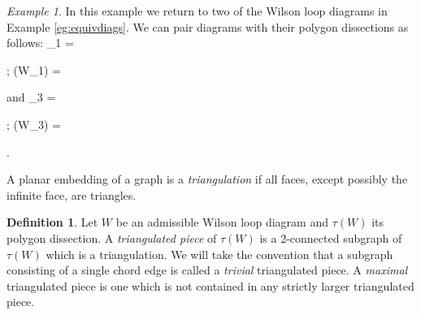 \documentclass[11pt]{article}
\newcommand{\drawWLD}[2]{

\pgfmathsetmacro{\n}{#1}
\pgfmathsetmacro{\radius}{#2}
\pgfmathsetmacro{\angle}{360/\n}
\draw (0,0) circle (\radius);
    \foreach \i in {1,2,...,\n} {
      \draw (\angle*\i:\radius) node {$\bullet$};
    }

}
\newcommand{\drawpolypart}[2]{
\pgfmathsetmacro{\n}{#1}
\pgfmathsetmacro{\radius}{#2}
\pgfmathsetmacro{\angle}{360/\n}
    \foreach \i in {1,2,...,\n} {
      \draw (\angle*\i+ \angle/2:\radius) node {$\bullet$};
     \pgfmathsetmacro{\x}{\angle*\i - \angle/2}
      \pgfmathsetmacro{\concave}{((\n-1.5)/\n)}
      \draw (\x:\radius cm) .. controls (\angle *\i: \concave* \radius cm) .. (\x + \angle:\radius cm);
    }

}
\newcommand{\drawprop}[4]{
\pgfmathsetmacro{\r}{#1}
\pgfmathsetmacro{\bumpr}{#2}
\pgfmathsetmacro{\s}{#3}
\pgfmathsetmacro{\bumps}{#4}
\pgfmathsetmacro{\perturbe}{\angle/\n}

\begin{scope}
\draw[propagator] (\angle*\r + \angle/2 + \bumpr*\perturbe:\radius) -- (\angle*\s + \angle/2 + \bumps*\perturbe:\radius);
\end{scope}
}
\newcommand{\drawchord}[2]{
\pgfmathsetmacro{\r}{#1}
\pgfmathsetmacro{\s}{#2}

\begin{scope}
\draw (\angle*\r + \angle/2:\radius) -- (\angle*\s + \angle/2:\radius);
\end{scope}
}
\newcommand{\drawnumbers}{
  \foreach \i in {1,2,...,\n} {
  \pgfmathsetmacro{\x}{\angle*\i}
  \draw (\x:\radius*1.15) node {\footnotesize \i};
}
}
\newcommand{\drawnumbersshift}{
  \foreach \i in {1,2,...,\n} {
  \pgfmathsetmacro{\x}{\angle*\i + \angle/2}
  \draw (\x:\radius*1.15) node {\footnotesize \i};
}
}
\def\bas #1\eas{\begin{align*} #1 \end{align*}}
\theoremstyle{remark}
\newtheorem{eg}[thm]{Example}
\theoremstyle{definition}
\newtheorem{dfn}[thm]{Definition}
\begin{document}
\begin{eg}\label{WLDtopolygonpartition}
In this example we return to two of the Wilson loop diagrams in Example \ref{eg:equivdiags}. We can pair diagrams with their polygon dissections as follows:
\bas W_1 =  \quad; \quad
\tau(W_1) = 
\eas and
\bas W_3 = \quad; \quad
\tau(W_3) =  .
\eas

\end{eg}

A planar embedding of a graph is a \emph{triangulation} if all faces, except possibly the infinite face, are triangles.

\begin{dfn}
  Let $W$ be an admissible Wilson loop diagram and $\tau(W)$ its polygon dissection. A \emph{triangulated piece} of $\tau(W)$ is a 2-connected subgraph of $\tau(W)$ which is a triangulation. We will take the convention that a subgraph consisting of a single chord edge is called a \emph{trivial} triangulated piece.
A {\em maximal} triangulated piece is one which is not contained in any strictly larger triangulated piece.
\end{dfn}
\end{document}
